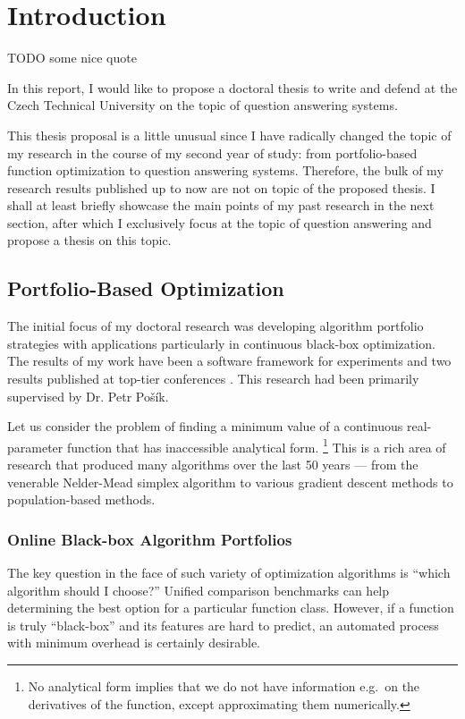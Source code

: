 \chapter{Introduction}
\label{ch:intro}

TODO some nice quote

In this report, I would like to propose a doctoral thesis to write
and defend at the Czech Technical University on the topic of question
answering systems.

This thesis proposal is a little unusual since I have radically changed
the topic of my research in the course of my second year of study:
from portfolio-based function optimization to question answering systems.
Therefore, the bulk of my research results published up to now are not
on topic of the proposed thesis.  I shall at least briefly showcase
the main points of my past research in the next section,
after which I exclusively focus at the topic of question answering
and propose a thesis on this topic.

\section{Portfolio-Based Optimization}

The initial focus of my doctoral research
was developing algorithm portfolio strategies
with applications particularly in continuous black-box optimization.
The results of my work have been a software framework for experiments
\cite{COCOpf}
and two results published at top-tier conferences \cite{optpf,ndsqistep}.
This research had been primarily supervised by Dr. Petr Pošík.

Let us consider the problem of finding a minimum value of a continuous
real-parameter function that has inaccessible analytical form.%
\footnote{No analytical form implies that we do not have information
e.g.\ on the derivatives of the function, except approximating
them numerically.}
This is a rich area of research that produced many algorithms over
the last 50 years --- from the venerable Nelder-Mead simplex
algorithm \cite{NM1} to various gradient descent methods to
population-based methods.

\subsection{Online Black-box Algorithm Portfolios}

The key question in the face of such variety of optimization
algorithms is ``which algorithm should I choose?''
Unified comparison benchmarks \cite{COCO1}
can help determining the best option for a particular function class.
However, if a function is truly ``black-box'' and its features
are hard to predict, an automated process with minimum overhead
is certainly desirable.

